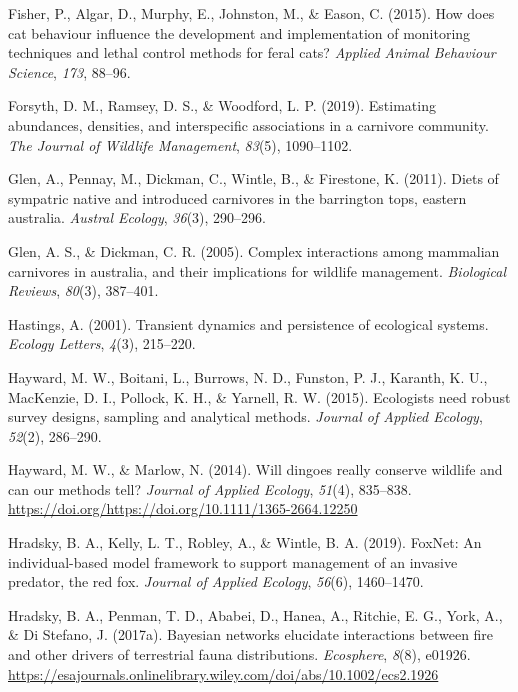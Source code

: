 \documentclass[]{elsarticle} %
\begin{document}
\leavevmode\hypertarget{ref-fisher2015}{}%
Fisher, P., Algar, D., Murphy, E., Johnston, M., \& Eason, C. (2015). How does cat behaviour influence the development and implementation of monitoring techniques and lethal control methods for feral cats? \emph{Applied Animal Behaviour Science}, \emph{173}, 88--96.

\leavevmode\hypertarget{ref-forsyth2019}{}%
Forsyth, D. M., Ramsey, D. S., \& Woodford, L. P. (2019). Estimating abundances, densities, and interspecific associations in a carnivore community. \emph{The Journal of Wildlife Management}, \emph{83}(5), 1090--1102.

\leavevmode\hypertarget{ref-glen2011}{}%
Glen, A., Pennay, M., Dickman, C., Wintle, B., \& Firestone, K. (2011). Diets of sympatric native and introduced carnivores in the barrington tops, eastern australia. \emph{Austral Ecology}, \emph{36}(3), 290--296.

\leavevmode\hypertarget{ref-glen2005}{}%
Glen, A. S., \& Dickman, C. R. (2005). Complex interactions among mammalian carnivores in australia, and their implications for wildlife management. \emph{Biological Reviews}, \emph{80}(3), 387--401.

\leavevmode\hypertarget{ref-hastings2001}{}%
Hastings, A. (2001). Transient dynamics and persistence of ecological systems. \emph{Ecology Letters}, \emph{4}(3), 215--220.

\leavevmode\hypertarget{ref-hayward2015}{}%
Hayward, M. W., Boitani, L., Burrows, N. D., Funston, P. J., Karanth, K. U., MacKenzie, D. I., Pollock, K. H., \& Yarnell, R. W. (2015). Ecologists need robust survey designs, sampling and analytical methods. \emph{Journal of Applied Ecology}, \emph{52}(2), 286--290.

\leavevmode\hypertarget{ref-https:ux2fux2fdoi.orgux2f10.1111ux2f1365-2664.12250}{}%
Hayward, M. W., \& Marlow, N. (2014). Will dingoes really conserve wildlife and can our methods tell? \emph{Journal of Applied Ecology}, \emph{51}(4), 835--838. \url{https://doi.org/https://doi.org/10.1111/1365-2664.12250}

\leavevmode\hypertarget{ref-hradsky2019foxnet}{}%
Hradsky, B. A., Kelly, L. T., Robley, A., \& Wintle, B. A. (2019). FoxNet: An individual-based model framework to support management of an invasive predator, the red fox. \emph{Journal of Applied Ecology}, \emph{56}(6), 1460--1470.

\leavevmode\hypertarget{ref-hradsky2017bayesian}{}%
Hradsky, B. A., Penman, T. D., Ababei, D., Hanea, A., Ritchie, E. G., York, A., \& Di Stefano, J. (2017a). Bayesian networks elucidate interactions between fire and other drivers of terrestrial fauna distributions. \emph{Ecosphere}, \emph{8}(8), e01926. \url{https://esajournals.onlinelibrary.wiley.com/doi/abs/10.1002/ecs2.1926}
\end{document}
